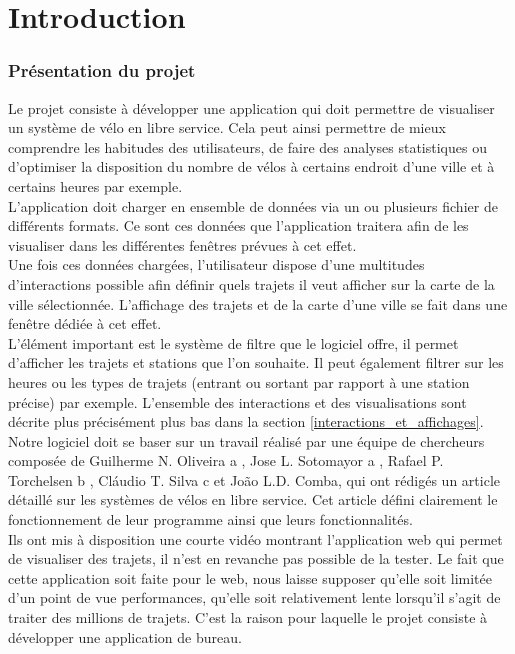 \documentclass[12pt]{article}
\begin{document}
\newpage
\part{Introduction}
	
	\section{Présentation du projet} \label{introduction}
	Le projet consiste à développer une application qui doit permettre de visualiser
	un système de vélo en libre service. Cela peut ainsi permettre de mieux comprendre les habitudes
	des utilisateurs, de faire des analyses statistiques ou d'optimiser la disposition du nombre de
	vélos à certains endroit d'une ville et à certains heures par exemple.\\

	L’application doit charger en ensemble de données via un ou plusieurs fichier de différents formats. Ce sont ces données que l'application traitera afin de les visualiser dans les différentes fenêtres prévues à cet effet.\\
	
	Une fois ces données chargées, l'utilisateur dispose d'une multitudes d'interactions
	possible afin définir quels trajets il veut afficher sur la carte de la ville sélectionnée.
	L'affichage des trajets et de la carte d'une ville se fait dans une fenêtre dédiée à cet effet.\\		
	L'élément important est le système de filtre que le logiciel offre, il permet d'afficher
	les trajets et stations que l’on souhaite. Il peut également filtrer sur les heures ou
	les types de trajets (entrant ou sortant par rapport à une station précise) par exemple. L'ensemble des interactions et des visualisations sont décrite plus précisément plus bas
	dans la section	\ref{interactions_et_affichages}. \\

	Notre logiciel doit se baser sur un travail réalisé par une équipe de chercheurs composée
	de Guilherme N. Oliveira a , Jose L. Sotomayor a , Rafael P. Torchelsen b , Cláudio T. Silva c
	et 
	João L.D. Comba, qui ont rédigés un article \cite{Oli16} détaillé sur les systèmes de vélos en
	libre service. Cet article défini clairement le fonctionnement de leur programme ainsi que leurs
	fonctionnalités. \\
	
	Ils ont mis à disposition une courte vidéo montrant l'application web qui permet 
	de visualiser des trajets, il n'est en revanche pas possible de la tester. Le fait
	que cette application
	soit faite pour le web, nous laisse	supposer qu’elle soit limitée d'un
	point de vue performances, qu’elle soit relativement lente lorsqu’il s’agit
	de traiter des millions de trajets. C’est la raison pour laquelle 
	le projet consiste à développer une application de bureau.
	
\end{document}
